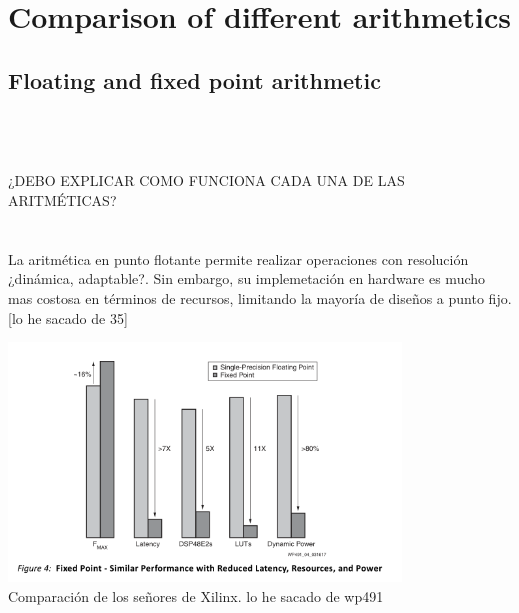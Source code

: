 \cleardoublepage
\chapter{Comparison of different arithmetics}
\label{makereference}
\section{Floating and fixed point arithmetic}

\\
\\
\\
¿DEBO EXPLICAR COMO FUNCIONA CADA UNA DE LAS ARITMÉTICAS?
\\
\\
\\

La aritmética en punto flotante permite realizar operaciones con resolución ¿dinámica, adaptable?. Sin embargo, su implemetación en hardware es mucho mas costosa en términos de recursos, limitando la mayoría de diseños a punto fijo.[lo he sacado de 35]

\includegraphics[height=2.5in]{figures/fp_vs_fp.png}
\\
Comparación de los señores de Xilinx. lo he sacado de wp491

